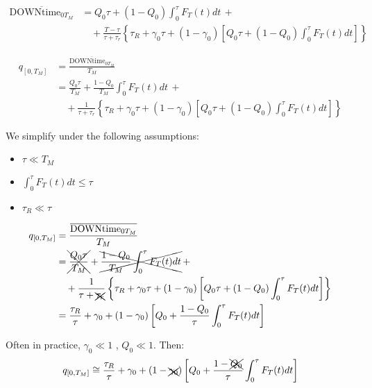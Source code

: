 \begin{equation*}
    \begin{split}
        \overline{\text{DOWNtime}_{0T_M}} &= Q_0\tau + (1-Q_0)\int_0^\tau F_T(t)dt\,+\\
        &\quad + \frac{T-\tau}{\tau+\tau_r} \left\{\tau_R + \gamma_0\tau + (1-\gamma_0)\left[Q_0\tau + (1-Q_0)\int_0^\tau F_T(t)dt\right] \right\}
    \end{split}
\end{equation*}

\begin{equation*}
    \begin{split}
        q_{[0,T_M]} &= \frac{\overline{\text{DOWNtime}_{0T_M}}}{T_M} \\
       &= \frac{Q_0\tau}{T_M} + \frac{1-Q_0}{T_M}\int_0^\tau F_T(t)dt\,+\\
       &\quad + \frac{1}{\tau+\tau_r} \left\{\tau_R + \gamma_0\tau + (1-\gamma_0)\left[Q_0\tau + (1-Q_0)\int_0^\tau F_T(t)dt\right] \right\}
    \end{split}
\end{equation*}
          
We simplify under the following assumptions:
\begin{itemize}
    \item $\tau\ll T_M$
    \item $\int_0^\tau F_T(t)dt \le \tau$
    \item $\tau_R \ll \tau$
\end{itemize}

\begin{equation*}
    \begin{split}
        q_{[0,T_M]} &= \frac{\overline{\text{DOWNtime}_{0T_M}}}{T_M} \\
       &= \xcancel{\frac{Q_0\tau}{T_M}} + \xcancel{\frac{1-Q_0}{T_M}\int_0^\tau F_T(t)dt}\,+\\
       &\quad + \frac{1}{\tau+\xcancel{\tau_r}} \left\{\tau_R + \gamma_0\tau + (1-\gamma_0)\left[Q_0\tau + (1-Q_0)\int_0^\tau F_T(t)dt\right] \right\} \\
       &= \frac{\tau_R}{\tau} + \gamma_0 + (1-\gamma_0)\left[Q_0 + \frac{1-Q_0}{\tau}\int_0^\tau F_T(t)dt\right]
       \end{split}
\end{equation*}

Often in practice, $\gamma_0 \ll 1$ , $Q_0 \ll 1$. Then:
\begin{equation*}
    q_{[0,T_M]} \cong \frac{\tau_R}{\tau} + \gamma_0 + (1-\xcancel{\gamma_0})\left[Q_0 + \frac{1-\xcancel{Q_0}}{\tau}\int_0^\tau F_T(t)dt\right]
\end{equation*}

